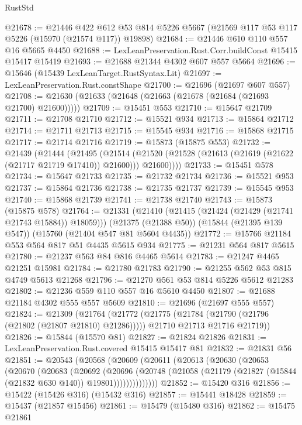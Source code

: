 \begin{lexlean}{RustStd}
\begin{coremodule}
@21678 := @21446
    @422
    @612
    @53
    @814
    @5226
    @5667
    (@21569 @117 @53 @117 @5226 (@15970 (@21574 @117)) @19898)
@21684 := @21446 @610 @110 @557 @16 @5665 @4450
@21688 := LexLeanPreservation.Rust.Corr.buildConst @15415 @15417 @15419
@21693 := @21688 @21344 @4302 @607 @557 @5664
@21696 := @15646 (@15439 LexLeanTarget.RustSyntax.Lit)
@21697 := LexLeanPreservation.Rust.constShape
@21700 := @21696 (@21697 @607 @557)
@21708 := @21630 (@21633 (@21648 (@21663 (@21678 (@21684 (@21693 @21700) @21600)))))
@21709 := @15451 @553
@21710 := @15647 @21709
@21711 := @21708 @21710
@21712 := @15521 @934
@21713 := @15864 @21712
@21714 := @21711 @21713
@21715 := @15545 @934
@21716 := @15868 @21715
@21717 := @21714 @21716
@21719 := @15873 (@15875 @553)
@21732 := @21439
    (@21444
      (@21495
        (@21514 (@21520 (@21528 (@21613 (@21619 (@21622 (@21717 @21719 @17410)) @21600))) @21600))))
@21733 := @15451 @578
@21734 := @15647 @21733
@21735 := @21732 @21734
@21736 := @15521 @953
@21737 := @15864 @21736
@21738 := @21735 @21737
@21739 := @15545 @953
@21740 := @15868 @21739
@21741 := @21738 @21740
@21743 := @15873 (@15875 @578)
@21764 := @21331
    (@21410 (@21415 (@21424 (@21429 (@21741 @21743 @15884)) @18059)))
    (@21375 (@21388 @50))
    (@15844 (@21395 @139 @547))
    (@15760 (@21404 @547 @81 @5604 @4435))
@21772 := @15766 @21184 @553 @564 @817 @51 @4435 @5615 @934
@21775 := @21231 @564 @817 @5615
@21780 := @21237 @563 @84 @816 @4465 @5614
@21783 := @21247 @4465 @21251 @15981
@21784 := @21780 @21783
@21790 := @21255 @562 @53 @815 @4749 @5613 @21268
@21796 := @21270 @561 @53 @814 @5226 @5612 @21283
@21802 := @21236 @559 @110 @557 @16 @5610 @4450
@21807 := @21688 @21184 @4302 @555 @557 @5609
@21810 := @21696 (@21697 @555 @557)
@21824 := @21309
    (@21764
      (@21772
        (@21775 (@21784 (@21790 (@21796 (@21802 (@21807 @21810) @21286)))))
        @21710
        @21713
        @21716
        @21719))
@21826 := @15844 (@15570 @81)
@21827 := @21824 @21826
@21831 := LexLeanPreservation.Rust.covered @15415 @15417 @81
@21832 := @21831 @56
@21851 := @20543
    (@20568
      (@20609
        (@20611
          (@20613
            (@20630
              (@20653
                (@20670
                  (@20683
                    (@20692
                      (@20696
                        (@20748
                          (@21058 (@21179 (@21827 (@15844 (@21832 @630 @140)) @19801))))))))))))))
@21852 := @15420 @316
@21856 := @15422 (@15426 @316) (@15432 @316)
@21857 := @15441 @18428
@21859 := @15437 (@21857 @15456)
@21861 := @15479 (@15480 @316)
@21862 := @15475 @21861

\end{coremodule}
\end{lexlean}
